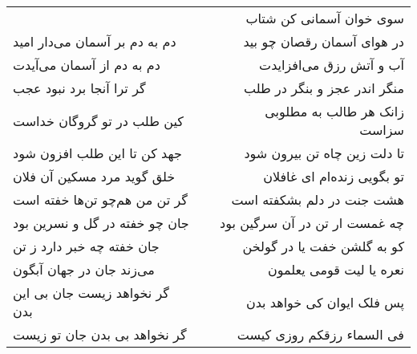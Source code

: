 \begin{center}
\begin{longtable}{l p{0.5cm} r}
&&
سوی خوان آسمانی کن شتاب
\\
دم به دم بر آسمان می‌دار امید
&&
در هوای آسمان رقصان چو بید
\\
دم به دم از آسمان می‌آیدت
&&
آب و آتش رزق می‌افزایدت
\\
گر ترا آنجا برد نبود عجب
&&
منگر اندر عجز و بنگر در طلب
\\
کین طلب در تو گروگان خداست
&&
زانک هر طالب به مطلوبی سزاست
\\
جهد کن تا این طلب افزون شود
&&
تا دلت زین چاه تن بیرون شود
\\
خلق گوید مرد مسکین آن فلان
&&
تو بگویی زنده‌ام ای غافلان
\\
گر تن من هم‌چو تن‌ها خفته است
&&
هشت جنت در دلم بشکفته است
\\
جان چو خفته در گل و نسرین بود
&&
چه غمست ار تن در آن سرگین بود
\\
جان خفته چه خبر دارد ز تن
&&
کو به گلشن خفت یا در گولخن
\\
می‌زند جان در جهان آبگون
&&
نعره یا لیت قومی یعلمون
\\
گر نخواهد زیست جان بی این بدن
&&
پس فلک ایوان کی خواهد بدن
\\
گر نخواهد بی بدن جان تو زیست
&&
فی السماء رزقکم روزی کیست
\\
\end{longtable}
\end{center}
